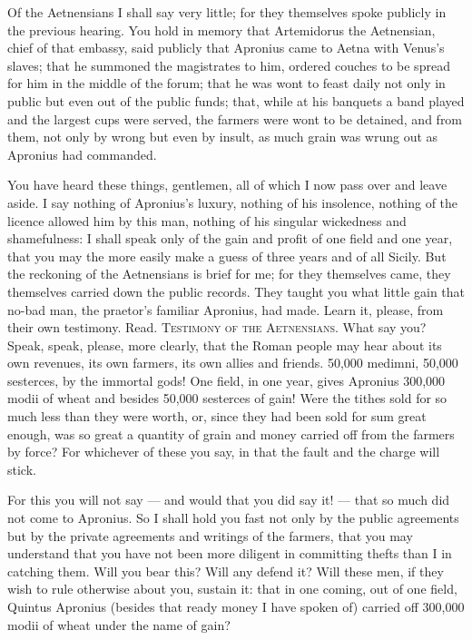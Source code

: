  Of the Aetnensians I shall say very little; for they themselves spoke publicly in the previous hearing. You hold in memory that Artemidorus the Aetnensian, chief of that embassy, said publicly that Apronius came to Aetna with Venus's slaves; that he summoned the magistrates to him, ordered couches to be spread for him in the middle of the forum; that he was wont to feast daily not only in public but even out of the public funds; that, while at his banquets a band played and the largest cups were served, the farmers were wont to be detained, and from them, not only by wrong but even by insult, as much grain was wrung out as Apronius had commanded.

 You have heard these things, gentlemen, all of which I now pass over and leave aside. I say nothing of Apronius's luxury, nothing of his insolence, nothing of the licence allowed him by this man, nothing of his singular wickedness and shamefulness: I shall speak only of the gain and profit of one field and one year, that you may the more easily make a guess of three years and of all Sicily. But the reckoning of the Aetnensians is brief for me; for they themselves came, they themselves carried down the public records. They taught you what little gain that no-bad man, the praetor's familiar Apronius, had made. Learn it, please, from their own testimony. Read. \textsc{Testimony of the Aetnensians}. What say you? Speak, speak, please, more clearly, that the Roman people may hear about its own revenues, its own farmers, its own allies and friends. 50,000 medimni, 50,000 sesterces, by the immortal gods! One field, in one year, gives Apronius 300,000 modii of wheat and besides 50,000 sesterces of gain! Were the tithes sold for so much less than they were worth, or, since they had been sold for sum great enough, was so great a quantity of grain and money carried off from the farmers by force? For whichever of these you say, in that the fault and the charge will stick.

 For this you will not say --- and would that you did say it! --- that so much did not come to Apronius. So I shall hold you fast not only by the public agreements but by the private agreements and writings of the farmers, that you may understand that you have not been more diligent in committing thefts than I in catching them. Will you bear this? Will any defend it? Will these men, if they wish to rule otherwise about you, sustain it: that in one coming, out of one field, Quintus Apronius (besides that ready money I have spoken of) carried off 300,000 modii of wheat under the name of gain?

